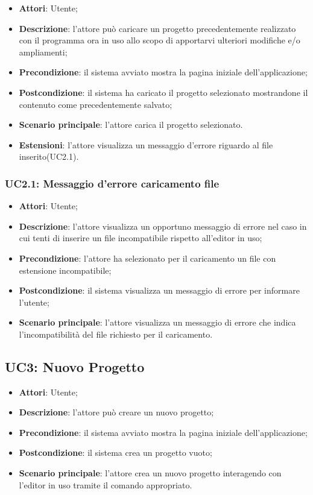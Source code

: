 	\begin{itemize}
		\item \textbf{Attori}: Utente;
		\item \textbf{Descrizione}: l'attore può caricare un progetto precedentemente realizzato con il programma ora in uso allo scopo di apportarvi 		ulteriori modifiche e/o ampliamenti;
		\item \textbf{Precondizione}: il sistema avviato mostra la pagina iniziale dell'applicazione;
		\item \textbf{Postcondizione}: il sistema ha caricato il progetto selezionato mostrandone il contenuto come precedentemente salvato;
		\item \textbf{Scenario principale}:
l'attore carica il progetto selezionato.
		\item \textbf{Estensioni}:
l'attore visualizza un messaggio d'errore riguardo al file inserito(UC2.1).
	\end{itemize}

	\subsubsection{UC2.1: Messaggio d'errore caricamento file}
	\label{UC2.1}
		\begin{itemize}
			\item \textbf{Attori}: Utente;
			\item \textbf{Descrizione}: l'attore visualizza un opportuno messaggio di errore nel caso in cui tenti di inserire un file incompatibile rispetto all'editor in uso;
			\item \textbf{Precondizione}: l'attore ha selezionato per il caricamento un file con estensione incompatibile;
			\item \textbf{Postcondizione}: il sistema visualizza un messaggio di errore per informare l'utente;
			\item \textbf{Scenario principale}: l'attore visualizza un messaggio di errore che indica l'incompatibilità del file richiesto per il caricamento.
		\end{itemize}

\subsection{UC3: Nuovo Progetto}
\label{UC3}
\begin{itemize}
\item \textbf{Attori}: Utente;
\item \textbf{Descrizione}: l'attore può creare un nuovo progetto; 
\item \textbf{Precondizione}: il sistema avviato mostra la pagina iniziale dell'applicazione;
\item \textbf{Postcondizione}: il sistema crea un progetto vuoto;
\item \textbf{Scenario principale}:
l'attore crea un nuovo progetto interagendo con l'editor in uso tramite il comando appropriato.
\end{itemize}

